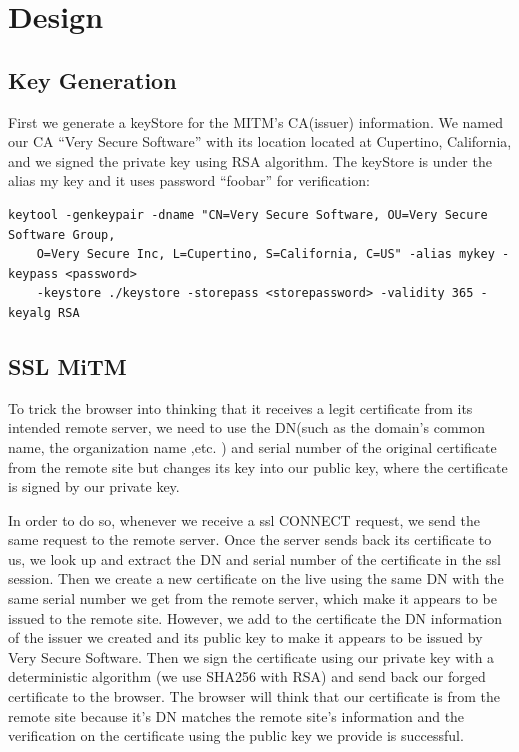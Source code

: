 \section{Design}

\subsection{Key Generation}

First we generate a keyStore for the MITM's CA(issuer) information. We named our CA ``Very Secure Software'' with its location located at Cupertino, California, and we signed the private key using RSA algorithm. The keyStore is under the alias my key and it uses password  ``foobar'' for verification:

\begin{lstlisting} 
keytool -genkeypair -dname "CN=Very Secure Software, OU=Very Secure Software Group, 
    O=Very Secure Inc, L=Cupertino, S=California, C=US" -alias mykey -keypass <password> 
    -keystore ./keystore -storepass <storepassword> -validity 365 -keyalg RSA
\end{lstlisting}

\subsection{SSL MiTM}

To trick the browser into thinking that it receives a legit certificate from its intended remote server, we need to use the DN(such as the domain's common name, the organization name ,etc. ) and serial number of the original certificate from the remote site but changes its key into our public key, where the certificate is signed by our private key. 

In order to do so, whenever we receive a ssl CONNECT request, we send the same request to the remote server.  Once the server sends back its certificate to us, we look up and extract the DN and serial number of the certificate in the ssl session. Then we create a new certificate on the live using the same DN with the same serial number we get from the remote server, which make it appears to be issued to the remote site. However, we add to the certificate the DN information of the issuer we created and its public key to make it appears to be issued by Very Secure Software. Then we sign the certificate using our private key with a deterministic algorithm (we use SHA256 with RSA) and send back our forged certificate to the browser. The browser will think that our certificate is from the remote site because it's DN matches the remote site's information and the verification on the certificate using the public key we provide is successful. 

